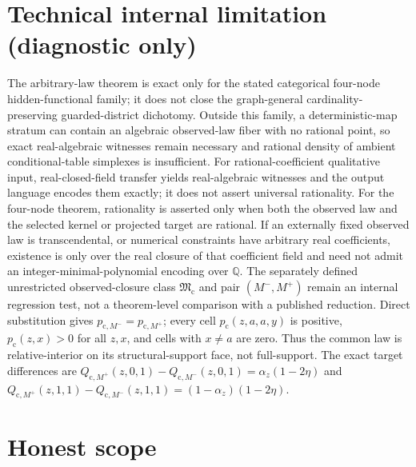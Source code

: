 \documentclass{article}
\begin{document}
\section*{Technical internal limitation (diagnostic only)}

The arbitrary-law theorem is exact only for the stated categorical four-node hidden-functional family; it does not close the graph-general cardinality-preserving guarded-district dichotomy.  Outside this family, a deterministic-map stratum can contain an algebraic observed-law fiber with no rational point, so exact real-algebraic witnesses remain necessary and rational density of ambient conditional-table simplexes is insufficient.  For rational-coefficient qualitative input, real-closed-field transfer yields real-algebraic witnesses and the output language encodes them exactly; it does not assert universal rationality.  For the four-node theorem, rationality is asserted only when both the observed law and the selected kernel or projected target are rational.  If an externally fixed observed law is transcendental, or numerical constraints have arbitrary real coefficients, existence is only over the real closure of that coefficient field and need not admit an integer-minimal-polynomial encoding over \(\mathbb Q\).  The separately defined unrestricted observed-closure class \(\mathfrak M_{\mathrm c}\) and pair \((M^-,M^+)\) remain an internal regression test, not a theorem-level comparison with a published reduction.  Direct substitution gives \(p_{\mathrm c,M^-}=p_{\mathrm c,M^+}\); every cell \(p_{\mathrm c}(z,a,a,y)\) is positive, \(p_{\mathrm c}(z,x)>0\) for all \(z,x\), and cells with \(x\ne a\) are zero.  Thus the common law is relative-interior on its structural-support face, not full-support.  The exact target differences are \(Q_{\mathrm c,M^+}(z,0,1)-Q_{\mathrm c,M^-}(z,0,1)=\alpha_z(1-2\eta)\) and \(Q_{\mathrm c,M^+}(z,1,1)-Q_{\mathrm c,M^-}(z,1,1)=(1-\alpha_z)(1-2\eta)\).

\section{Honest scope}
\end{document}
